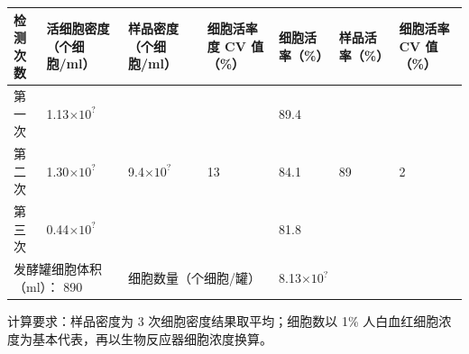 \documentclass[UTF8,10pt,a4paper,fontset=fandol]{ctexart}
\newcommand{\fieldvalue}[1]{#1}
\newcommand{\handwritten}[1]{#1}
\begin{document}
\vspace{0.2em}

\small
\begin{tabularx}{\textwidth}{|p{}|X|X|X|X|X|X|}
\hline
检测次数 &
活细胞密度（个细胞/ml） &
样品密度（个细胞/ml） &
细胞活率度 CV 值（\%） &
细胞活率（\%） &
样品活率（\%） &
细胞活率 CV 值（\%） \\
\hline
第一次 &
\fieldvalue{\handwritten{1.13$\times 10^{?}$}} &
&
&
\fieldvalue{\handwritten{89.4}} &
& \\
\hline
第二次 &
\fieldvalue{\handwritten{1.30$\times 10^{?}$}} &
\fieldvalue{\handwritten{9.4$\times 10^{?}$}} &
\fieldvalue{\handwritten{13}} &
\fieldvalue{\handwritten{84.1}} &
\fieldvalue{\handwritten{89}} &
\fieldvalue{\handwritten{2}} \\
\hline
第三次 &
\fieldvalue{\handwritten{0.44$\times 10^{?}$}} &
&
&
\fieldvalue{\handwritten{81.8}} &
& \\
\hline
\multicolumn{2}{|l|}{发酵罐细胞体积（ml）：
\fieldvalue{\handwritten{890}}} &
\multicolumn{2}{l|}{细胞数量（个细胞/罐）} &
\multicolumn{3}{l|}{
\fieldvalue{\handwritten{8.13$\times 10^{?}$}}} \\
\hline
\end{tabularx}

\normalsize

\noindent
计算要求：样品密度为 3 次细胞密度结果取平均；细胞数以 1\% 人白血红细胞浓度为基本代表，再以生物反应器细胞浓度换算。
\end{document}

